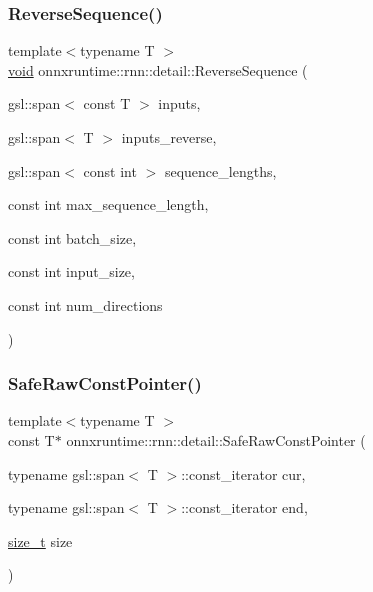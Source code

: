 \subsubsection{\texorpdfstring{Reverse\+Sequence()}{ReverseSequence()}}
{\footnotesize\ttfamily template$<$typename T $>$ \\
\mbox{\hyperlink{mlasi_8h_a88f941d423cb2a819b70a1358982b1a6}{void}} onnxruntime\+::rnn\+::detail\+::\+Reverse\+Sequence (\begin{DoxyParamCaption}\item[{gsl\+::span$<$ const T $>$}]{inputs,  }\item[{gsl\+::span$<$ T $>$}]{inputs\+\_\+reverse,  }\item[{gsl\+::span$<$ const int $>$}]{sequence\+\_\+lengths,  }\item[{const int}]{max\+\_\+sequence\+\_\+length,  }\item[{const int}]{batch\+\_\+size,  }\item[{const int}]{input\+\_\+size,  }\item[{const int}]{num\+\_\+directions }\end{DoxyParamCaption})}

\mbox{\label{namespaceonnxruntime_1_1rnn_1_1detail_ac6e5fd9766ba90302551cd51d222bc91}} 
\subsubsection{\texorpdfstring{Safe\+Raw\+Const\+Pointer()}{SafeRawConstPointer()}\hspace{0.1cm}{\footnotesize\ttfamily [1/2]}}
{\footnotesize\ttfamily template$<$typename T $>$ \\
const T$\ast$ onnxruntime\+::rnn\+::detail\+::\+Safe\+Raw\+Const\+Pointer (\begin{DoxyParamCaption}\item[{typename gsl\+::span$<$ T $>$\+::const\+\_\+iterator}]{cur,  }\item[{typename gsl\+::span$<$ T $>$\+::const\+\_\+iterator}]{end,  }\item[{\mbox{\hyperlink{mlasi_8h_a503efbc1c6e50825320ad909366b78ab}{size\+\_\+t}}}]{size }\end{DoxyParamCaption})}

